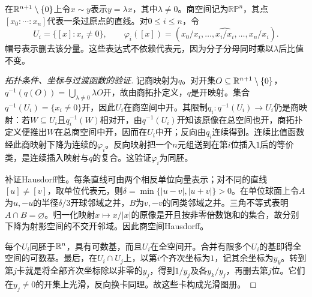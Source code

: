 \begin{example}[实射影空间的完整坐标构造]
在$\mathbb{R}^{n+1}\setminus\{0\}$上令$x\sim y$表示$y=\lambda x$，其中$\lambda\ne0$。商空间记为$\mathbb{RP}^n$，其点$[x_0:\cdots:x_n]$代表一条过原点的直线。对$0\leq i\leq n$，令
\[
U_i=\{[x]:x_i\ne0\},\qquad
\varphi_i([x])=(x_0/x_i,\ldots,\widehat{x_i/x_i},\ldots,x_n/x_i).
\]
帽号表示删去该分量。这些表达式不依赖代表元，因为分子分母同时乘以$\lambda$后比值不变。
\end{example}
\begin{proof}[拓扑条件、坐标与过渡函数的验证]
记商映射为$q$。对开集$O\subseteq\mathbb{R}^{n+1}\setminus\{0\}$，
$q^{-1}(q(O))=\bigcup_{\lambda\ne0}\lambda O$开，故由商拓扑定义，$q$是开映射。集合$q^{-1}(U_i)=\{x_i\ne0\}$开，因此$U_i$在商空间中开。其限制$q_i:q^{-1}(U_i)\to U_i$仍是商映射：若$W\subseteq U_i$且$q_i^{-1}(W)$相对开，由$q^{-1}(U_i)$开知该原像在总空间也开，商拓扑定义便推出$W$在总商空间中开，因而在$U_i$中开；反向由$q_i$连续得到。连续比值函数经此商映射下降为连续的$\varphi_i$。反向映射把一个$n$元组送到在第$i$位插入$1$后的等价类，是连续插入映射与$q$的复合。这验证$\varphi_i$为同胚。

补证Hausdorff性。每条直线可由两个相反单位向量表示；对不同的直线$[u]\ne[v]$，取单位代表元，则$\delta=\min\{|u-v|,|u+v|\}>0$。在单位球面上令$A$为$u,-u$的半径$\delta/3$开球邻域之并，$B$为$v,-v$的同类邻域之并。三角不等式表明$A\cap B=\varnothing$。归一化映射$x\mapsto x/|x|$的原像是开且按非零倍数饱和的集合，故分别下降为射影空间的不交开邻域。因此商空间Hausdorff。

每个$U_i$同胚于$\mathbb{R}^n$，具有可数基，而且$U_i$在全空间开。合并有限多个$U_i$的基即得全空间的可数基。最后，在$U_i\cap U_j$上，以第$i$个齐次坐标为$1$，记其余坐标为$y_k$。转到第$j$卡就是将全部齐次坐标除以非零的$y_j$，得到$1/y_j$及各$y_k/y_j$，再删去第$j$位。它们在$y_j\ne0$的开集上光滑，反向换卡同理。故这些卡构成光滑图册。
\end{proof}




